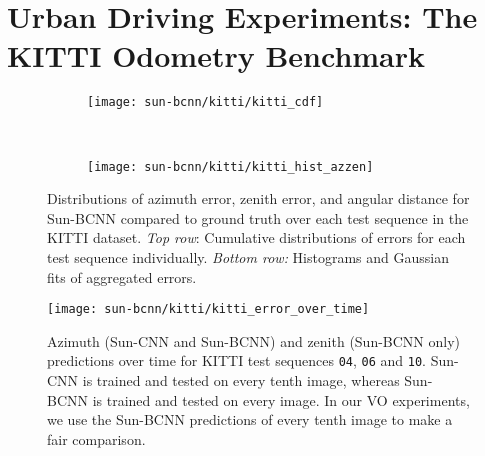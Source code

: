 \section{Urban Driving Experiments: The KITTI Odometry Benchmark}
\begin{figure}
    \centering
    \begin{subfigure}[b]{0.75\textwidth}
        \texttt{[image: sun-bcnn/kitti/kitti\_cdf]}
    \end{subfigure} ~
    \begin{subfigure}[b]{0.75\textwidth}
        \texttt{[image: sun-bcnn/kitti/kitti\_hist\_azzen]}
    \end{subfigure}
    \caption{Distributions of azimuth error, zenith error, and angular distance for Sun-BCNN compared to ground truth over each test sequence in the KITTI dataset. \emph{Top row}: Cumulative distributions of errors for each test sequence individually. \emph{Bottom row:} Histograms and Gaussian fits of aggregated errors.}
    \label{fig:sun-bcnn_kitti_cnn_testerrors}
\end{figure}

\begin{figure}
    \centering
    \texttt{[image: sun-bcnn/kitti/kitti\_error\_over\_time]}
    \caption{Azimuth (Sun-CNN and Sun-BCNN) and zenith (Sun-BCNN only) predictions over time for KITTI test sequences \texttt{04}, \texttt{06} and \texttt{10}. Sun-CNN is trained and tested on every tenth image, whereas Sun-BCNN is trained and tested on every image. In our VO experiments, we use the Sun-BCNN predictions of every tenth image to make a fair comparison. }
    \label{fig:sun-bcnn_kitti_error_over_time}
\end{figure}

